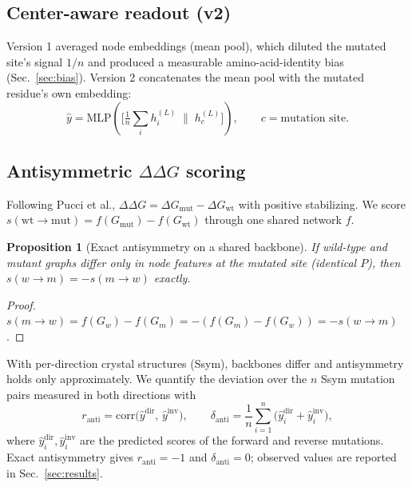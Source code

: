 \documentclass[11pt]{article}
\newtheorem{proposition}{Proposition}
\begin{document}
\subsection{Center-aware readout (v2)}
Version 1 averaged node embeddings (mean pool), which diluted the mutated
site's signal $1/n$ and produced a measurable amino-acid-identity bias
(Sec.~\ref{sec:bias}). Version 2 concatenates the mean pool with the
mutated residue's own embedding:
\begin{equation}
\hat y = \mathrm{MLP}\!\left(\Big[\tfrac{1}{n}\textstyle\sum_i h_i^{(L)}\;\Big\|\; h_{c}^{(L)}\Big]\right),
\qquad c=\text{mutation site}.
\label{eq:readout}
\end{equation}

\subsection{Antisymmetric $\Delta\Delta G$ scoring}
Following Pucci et al., $\Delta\Delta G = \Delta G_{\mathrm{mut}}-\Delta G_{\mathrm{wt}}$ with positive
stabilizing. We score $s(\text{wt}\!\to\!\text{mut}) = f(G_{\text{mut}})-f(G_{\text{wt}})$
through one shared network $f$.
\begin{proposition}[Exact antisymmetry on a shared backbone]
\label{prop:antisym}
If wild-type and mutant graphs differ only in node features at the mutated
site (identical $P$), then $s(w\!\to\!m) = -s(m\!\to\!w)$ exactly.
\end{proposition}
\begin{proof}
$s(m\!\to\!w)=f(G_w)-f(G_m) = -(f(G_m)-f(G_w)) = -s(w\!\to\!m)$.
\end{proof}
With per-direction crystal structures (Ssym), backbones differ and
antisymmetry holds only approximately. We quantify the deviation over
the $n$ Ssym mutation pairs measured in both directions with
\begin{equation}
r_{\mathrm{anti}} = \mathrm{corr}\big(\hat y^{\mathrm{dir}},\,\hat y^{\mathrm{inv}}\big),
\qquad
\delta_{\mathrm{anti}} = \frac{1}{n}\sum_{i=1}^{n}\big(\hat y^{\mathrm{dir}}_i+\hat y^{\mathrm{inv}}_i\big),
\label{eq:antisymdev}
\end{equation}
where $\hat y^{\mathrm{dir}}_i, \hat y^{\mathrm{inv}}_i$ are the predicted
scores of the forward and reverse mutations. Exact antisymmetry gives
$r_{\mathrm{anti}}=-1$ and $\delta_{\mathrm{anti}}=0$; observed values are
reported in Sec.~\ref{sec:results}.
\end{document}

